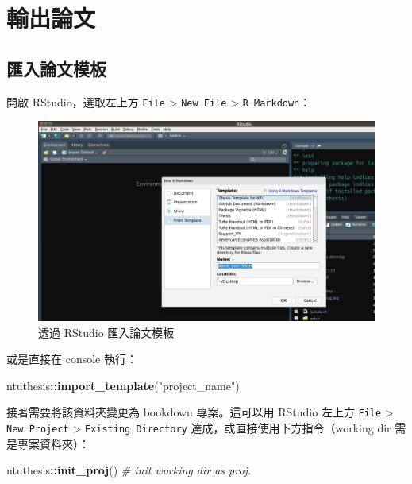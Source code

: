 \documentclass[oneside]{book}
\newenvironment{Shaded}{\begin{snugshade}}{\end{snugshade}}
\newcommand{\KeywordTok}[1]{\textcolor[rgb]{0.13,0.29,0.53}{\textbf{#1}}}
\newcommand{\StringTok}[1]{\textcolor[rgb]{0.31,0.60,0.02}{#1}}
\newcommand{\CommentTok}[1]{\textcolor[rgb]{0.56,0.35,0.01}{\textit{#1}}}
\newcommand{\OperatorTok}[1]{\textcolor[rgb]{0.81,0.36,0.00}{\textbf{#1}}}
\newcommand{\NormalTok}[1]{#1}
\theoremstyle{definition}
\theoremstyle{definition}
\theoremstyle{definition}
\theoremstyle{remark}
\begin{document}
\chapter{輸出論文}\label{export-thesis}

\section{匯入論文模板}\label{import-template}

開啟 RStudio，選取左上方 \texttt{File} \textgreater{} \texttt{New\ File}
\textgreater{} \texttt{R\ Markdown}：

\begin{figure}[H]

{\centering \includegraphics[width=1\linewidth]{figs/rmd-template} 

}

\caption{透過 RStudio 匯入論文模板}\label{fig:unnamed-chunk-2}
\end{figure}

或是直接在 console 執行：

\begin{Shaded}
\begin{Highlighting}[]
\NormalTok{ntuthesis}\OperatorTok{::}\KeywordTok{import_template}\NormalTok{(}\StringTok{"project_name"}\NormalTok{)}
\end{Highlighting}
\end{Shaded}

接著需要將該資料夾變更為 bookdown 專案。這可以用 RStudio 左上方
\texttt{File} \textgreater{} \texttt{New\ Project} \textgreater{}
\texttt{Existing\ Directory} 達成，或直接使用下方指令（working dir
需是專案資料夾）：

\begin{Shaded}
\begin{Highlighting}[]
\NormalTok{ntuthesis}\OperatorTok{::}\KeywordTok{init_proj}\NormalTok{()  }\CommentTok{# init working dir as proj.}
\end{Highlighting}
\end{Shaded}
\end{document}
